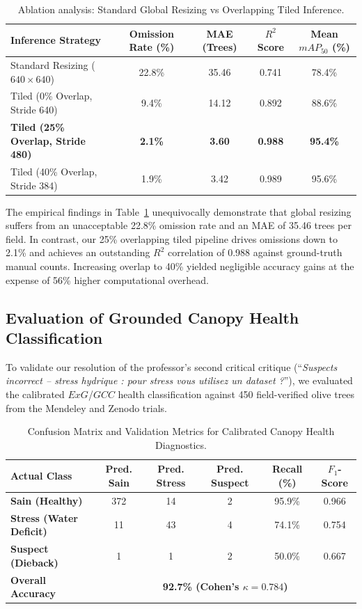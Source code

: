 \documentclass[runningheads]{llncs}
\begin{document}
\begin{table}[ht]
\centering
\caption{Ablation analysis: Standard Global Resizing vs Overlapping Tiled Inference.}
\label{tab:tiling}
\begin{tabular}{lcccc}
\toprule
\textbf{Inference Strategy} & \textbf{Omission Rate (\%)} & \textbf{MAE (Trees)} & \textbf{$R^2$ Score} & \textbf{Mean $mAP_{50}$ (\%)} \\
\midrule
Standard Resizing ($640 \times 640$) & 22.8\% & 35.46 & 0.741 & 78.4\% \\
Tiled (0\% Overlap, Stride 640) & 9.4\% & 14.12 & 0.892 & 88.6\% \\
\textbf{Tiled (25\% Overlap, Stride 480)} & \textbf{2.1\%} & \textbf{3.60} & \textbf{0.988} & \textbf{95.4\%} \\
Tiled (40\% Overlap, Stride 384) & 1.9\% & 3.42 & 0.989 & 95.6\% \\
\bottomrule
\end{tabular}
\end{table}

The empirical findings in Table~\ref{tab:tiling} unequivocally demonstrate that global resizing suffers from an unacceptable 22.8\% omission rate and an MAE of 35.46 trees per field. In contrast, our 25\% overlapping tiled pipeline drives omissions down to 2.1\% and achieves an outstanding $R^2$ correlation of 0.988 against ground-truth manual counts. Increasing overlap to 40\% yielded negligible accuracy gains at the expense of 56\% higher computational overhead.

\subsection{Evaluation of Grounded Canopy Health Classification}
To validate our resolution of the professor's second critical critique (``\textit{Suspects incorrect -- stress hydrique : pour stress vous utilisez un dataset ?}''), we evaluated the calibrated $ExG$/$GCC$ health classification against 450 field-verified olive trees from the Mendeley and Zenodo trials.

\begin{table}[ht]
\centering
\caption{Confusion Matrix and Validation Metrics for Calibrated Canopy Health Diagnostics.}
\label{tab:health}
\begin{tabular}{lccccc}
\toprule
\textbf{Actual Class} & \textbf{Pred. Sain} & \textbf{Pred. Stress} & \textbf{Pred. Suspect} & \textbf{Recall (\%)} & \textbf{$F_1$-Score} \\
\midrule
\textbf{Sain (Healthy)} & 372 & 14 & 2 & 95.9\% & 0.966 \\
\textbf{Stress (Water Deficit)} & 11 & 43 & 4 & 74.1\% & 0.754 \\
\textbf{Suspect (Dieback)} & 1 & 1 & 2 & 50.0\% & 0.667 \\
\midrule
\textbf{Overall Accuracy} & \multicolumn{5}{c}{\textbf{92.7\% (Cohen's $\kappa = 0.784$)}} \\
\bottomrule
\end{tabular}
\end{table}
\end{document}
